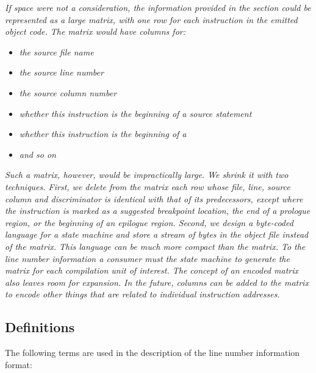 \textit{If space were not a consideration, the information provided
in the \dotdebugline{} 
section could be represented as a large
matrix, with one row for each instruction in the emitted
object code. The matrix would have columns for:}
\begin{itemize}
\item \textit{the source file name}
\item \textit{the source line number}
\item \textit{the source column number}
\item \textit{whether this instruction is the beginning of a source statement}
\item \textit{whether this instruction is the beginning of a }
\item \textit{and so on}
\end{itemize}
\textit{Such a matrix, however, would be impractically large. We
shrink it with two techniques. First, we delete from
the matrix each row whose file, line, source column and
discriminator 
is identical with that of its
\bb
predecessors, except where the instruction is marked as a 
suggested breakpoint location, the end of a prologue region, 
or the beginning of an epilogue region. 
\eb
Second, we design a byte-coded language
for a state machine and store a stream of bytes in the object
file instead of the matrix. This language can be much more
compact than the matrix. To the line number information a 
consumer must  the state machine
to generate the matrix for each compilation unit of interest.
The concept of an encoded matrix also leaves
room for expansion. In the future, columns can be added to the
matrix to encode other things that are related to individual
instruction addresses.}

\subsection{Definitions}
\label{chap:definitions}
The following terms are used in the description of the line
number information format:

